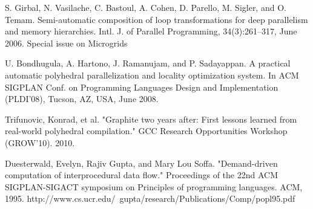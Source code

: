 
S. Girbal, N. Vasilache, C. Bastoul, A. Cohen, D. Parello, M. Sigler, and O. Temam.
Semi-automatic composition of loop transformations for deep parallelism and memory
hierarchies. Intl. J. of Parallel Programming, 34(3):261–317, June 2006. Special issue on
Microgrids


U. Bondhugula, A. Hartono, J. Ramanujam, and P. Sadayappan. A practical automatic
polyhedral parallelization and locality optimization system. In ACM SIGPLAN Conf. on
Programming Languages Design and Implementation (PLDI’08), Tucson, AZ, USA, June
2008.

Trifunovic, Konrad, et al. "Graphite two years after: First lessons learned
from real-world polyhedral compilation."
GCC Research Opportunities Workshop (GROW'10). 2010.


Duesterwald, Evelyn, Rajiv Gupta, and Mary Lou Soffa. "Demand-driven computation of interprocedural data flow." Proceedings of the 22nd ACM SIGPLAN-SIGACT symposium on Principles of programming languages. ACM, 1995.
http://www.cs.ucr.edu/~gupta/research/Publications/Comp/popl95.pdf

